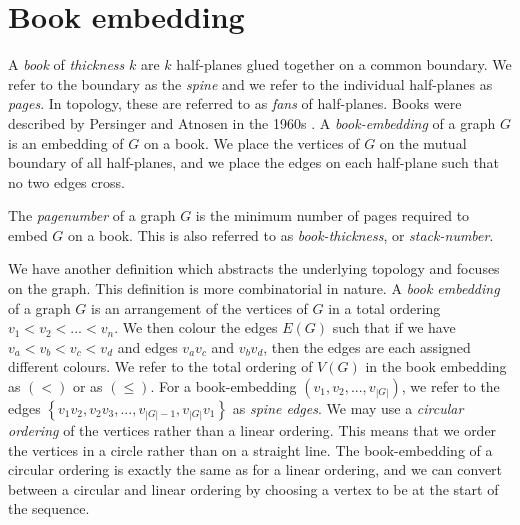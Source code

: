 \section{Book embedding}\label{sec:Book Embedding}
A \textit{book} of \textit{thickness} $k$ are $k$ half-planes glued together on a common boundary. We refer to the boundary as the \textit{spine} and we refer to the individual half-planes as \textit{pages}. In topology, these are referred to as \textit{fans} of half-planes. Books were described by Persinger and Atnosen in the 1960s \cite{persingerSubsetsNbooksE31966, atneosenOnedimensionalNleavedContinua1972}. 
A \textit{book-embedding} of a graph $G$ is an embedding of $G$ on a book. We place the vertices of $G$ on the mutual boundary of all half-planes, and we place the edges on each half-plane such that no two edges cross.

The \textit{pagenumber} of a graph $G$ is the minimum number of pages required to embed $G$ on a book. This is also referred to as \textit{book-thickness}, or \textit{stack-number}. 

We have another definition which abstracts the underlying topology and focuses on the graph. This definition is more combinatorial in nature. 
A \textit{book embedding} of a graph $G$ is an arrangement of the vertices of $G$ in a total ordering $v_1 < v_2 < ... < v_n$. We then colour the edges $E(G)$ such that if we have $v_a < v_b < v_c < v_d$ and edges $v_a v_c$ and $v_b v_d$, then the edges are each assigned different colours.
We refer to the total ordering of $V(G)$ in the book embedding as $(<)$ or as $(\leq)$. For a book-embedding $(v_1, v_2, ..., v_{|G|})$, we refer to the edges $\left\{v_1 v_2, v_2 v_3, ..., v_{|G| - 1}, v_{|G|}v_{1}\right\}$ as \textit{spine edges}.
We may use a \textit{circular ordering} of the vertices rather than a linear ordering. This means that we order the vertices in a circle rather than on a straight line. The book-embedding of a circular ordering is exactly the same as for a linear ordering, and we can convert between a circular and linear ordering by choosing a vertex to be at the start of the sequence. 

